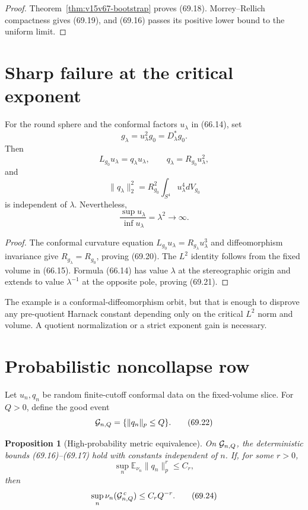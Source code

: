 \documentclass[11pt]{article}
\newtheorem{proposition}[theorem]{Proposition}
\theoremstyle{remark}
\begin{document}
\begin{proof}
Theorem~\ref{thm:v15v67-bootstrap} proves (69.18).
Morrey--Rellich compactness gives (69.19), and (69.16) passes its
positive lower bound to the uniform limit.
\end{proof}

\section{Sharp failure at the critical exponent}

\begin{counterexample}
\label{cnt:v15v69-critical}
For the round sphere and the conformal factors \(u_\lambda\) in
(66.14), set
\[
 g_\lambda=u_\lambda^2g_0=D_\lambda^*g_0.
\]
Then
\[
 L_{g_0}u_\lambda=q_\lambda u_\lambda,\qquad
 q_\lambda=R_{g_0}u_\lambda^2,                        \tag{69.20}
\]
and
\[
 \|q_\lambda\|_2^2
 =
 R_{g_0}^2\int_{S^4}u_\lambda^4dV_{g_0}
\]
is independent of \(\lambda\).  Nevertheless,
\[
 \frac{\sup u_\lambda}{\inf u_\lambda}
 =\lambda^2\longrightarrow\infty.                    \tag{69.21}
\]
\end{counterexample}

\begin{proof}
The conformal curvature equation
\(L_{g_0}u_\lambda=R_{g_\lambda}u_\lambda^3\)
and diffeomorphism invariance give
\(R_{g_\lambda}=R_{g_0}\), proving (69.20).
The \(L^2\) identity follows from the fixed volume in (66.15).
Formula (66.14) has value \(\lambda\) at the stereographic origin
and extends to value \(\lambda^{-1}\) at the opposite pole, proving
(69.21).
\end{proof}

The example is a conformal-diffeomorphism orbit, but that is enough
to disprove any pre-quotient Harnack constant depending only on the
critical \(L^2\) norm and volume.  A quotient normalization or a
strict exponent gain is necessary.

\section{Probabilistic noncollapse row}

Let \(u_n,q_n\) be random finite-cutoff conformal data on the
fixed-volume slice.  For \(Q>0\), define the good event
\[
 {\cal G}_{n,Q}=\{\|q_n\|_p\leq Q\}.                  \tag{69.22}
\]

\begin{proposition}[High-probability metric equivalence]
\label{prop:v15v69-probability}
On \({\cal G}_{n,Q}\), the deterministic bounds (69.16)--(69.17)
hold with constants independent of \(n\).  If, for some \(r>0\),
\[
 \sup_n\mathbb E_{\nu_n}\|q_n\|_p^r\leq C_r,          \tag{69.23}
\]
then
\[
 \sup_n\nu_n({\cal G}_{n,Q}^{\,c})
 \leq C_rQ^{-r}.                                      \tag{69.24}
\]
\end{proposition}
\end{document}
